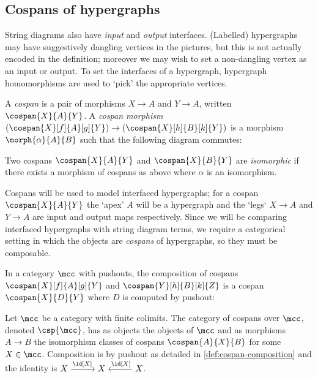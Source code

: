 \subsection{Cospans of hypergraphs}

String diagrams also have \emph{input} and \emph{output} interfaces.
(Labelled) hypergraphs may have suggestively dangling vertices in the pictures,
but this is not actually encoded in the definition; moreover we may wish to
set a non-dangling vertex as an input or output.
To set the interfaces of a hypergraph, hypergraph homomorphisms are used
to `pick' the appropriate vertices.

\begin{definition}[Cospan]
    A \emph{cospan} is a pair of morphisms \(X \to A\)
    and \(Y \to A\), written \(\cospan{X}{A}{Y}\).
    A \emph{cospan morphism} \(
    (\cospan{X}[f]{A}[g]{Y}) \to (\cospan{X}[h]{B}[k]{Y})
    \) is a morphism \(\morph{\alpha}{A}{B}\) such that the following diagram
    commutes:
    \begin{center}
        
    \end{center}
    Two cospans \(\cospan{X}{A}{Y}\) and \(\cospan{X}{B}{Y}\) are
    \emph{isomorphic} if there exists a morphism of cospans as above where
    \(\alpha\) is an isomorphism.
\end{definition}

Cospans will be used to model interfaced hypergraphs; for a cospan
\(\cospan{X}{A}{Y}\) the `apex' \(A\) will be a hypergraph and the `legs`
\(X \to A\) and \(Y \to A\) are input and output maps respectively.
Since we will be comparing interfaced hypergraphs with string diagram terms,
we require a categorical setting in which the objects are
\emph{cospans} of hypergraphs, so they must be composable.

\begin{definition}
    \label{def:cospan-composition}
    In a category \(\mcc\) with pushouts, the composition of cospans
    \(\cospan{X}[f]{A}[g]{Y}\) and \(\cospan{Y}[h]{B}[k]{Z}\) is a cospan
    \(\cospan{X}{D}{Y}\) where \(D\) is computed by pushout:
    \begin{center}
        
    \end{center}
\end{definition}

\begin{definition}
    Let \(\mcc\) be a category with finite colimits.
    The category of cospans over \(\mcc\), denoted \(\csp{\mcc}\),
    has as objects the objects of \(\mcc\) and as morphisms \(A \to B\)
    the isomorphism classes of cospans \(\cospan{A}{X}{B}\) for some
    \(X \in \mcc\).
    Composition is by pushout as detailed in \cref{def:cospan-composition} and
    the identity is \(X \xrightarrow{\id[X]} X \xleftarrow{\id[X]} X\).
\end{definition}

